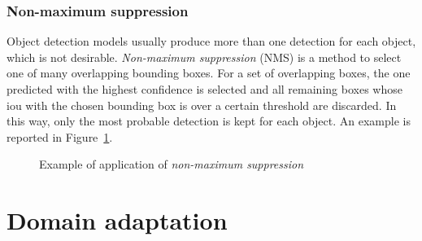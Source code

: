 \documentclass[%
    corpo=12pt,
    twoside,
    stile=classica,   
    tipotesi=magistrale,
    evenboxes,
    english,
	numerazioneromana,
]{toptesi}
\begin{document}
\subsubsection{Non-maximum suppression}
Object detection models usually produce more than one detection for each object, which is not desirable. \textit{Non-maximum suppression} (NMS) is a method to select one of many overlapping bounding boxes. For a set of overlapping boxes, the one predicted with the highest confidence is selected and all remaining boxes whose \gls{iou} with the chosen bounding box is over a certain threshold are discarded. In this way, only the most probable detection is kept for each object. An example is reported in Figure~\ref{fig:nms}.

\begin{figure}[ht]
	\centering
	\caption{Example of application of \textit{non-maximum suppression}}
	\label{fig:nms}
\end{figure}


\section{Domain adaptation}
\end{document}
